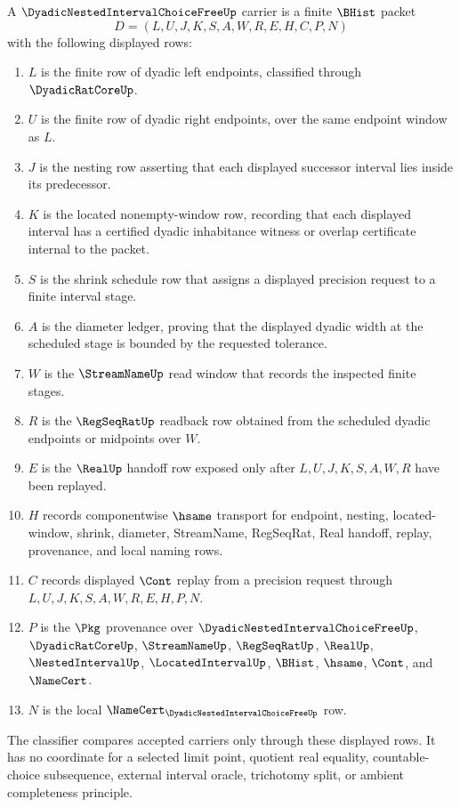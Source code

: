 \begin{definition}\label{def:dyadic-nested-interval-choice-free-carrier}
A $\DyadicNestedIntervalChoiceFreeUp$ carrier is a finite $\BHist$ packet
$$
D=(L,U,J,K,S,A,W,R,E,H,C,P,N)
$$
with the following displayed rows:
\begin{enumerate}
\item $L$ is the finite row of dyadic left endpoints, classified through $\DyadicRatCoreUp$.
\item $U$ is the finite row of dyadic right endpoints, over the same endpoint window as $L$.
\item $J$ is the nesting row asserting that each displayed successor interval lies inside its predecessor.
\item $K$ is the located nonempty-window row, recording that each displayed interval has a certified dyadic inhabitance witness or overlap certificate internal to the packet.
\item $S$ is the shrink schedule row that assigns a displayed precision request to a finite interval stage.
\item $A$ is the diameter ledger, proving that the displayed dyadic width at the scheduled stage is bounded by the requested tolerance.
\item $W$ is the $\StreamNameUp$ read window that records the inspected finite stages.
\item $R$ is the $\RegSeqRatUp$ readback row obtained from the scheduled dyadic endpoints or midpoints over $W$.
\item $E$ is the $\RealUp$ handoff row exposed only after $L,U,J,K,S,A,W,R$ have been replayed.
\item $H$ records componentwise $\hsame$ transport for endpoint, nesting, located-window, shrink, diameter, StreamName, RegSeqRat, Real handoff, replay, provenance, and local naming rows.
\item $C$ records displayed $\Cont$ replay from a precision request through $L,U,J,K,S,A,W,R,E,H,P,N$.
\item $P$ is the $\Pkg$ provenance over $\DyadicNestedIntervalChoiceFreeUp$, $\DyadicRatCoreUp$, $\StreamNameUp$, $\RegSeqRatUp$, $\RealUp$, $\NestedIntervalUp$, $\LocatedIntervalUp$, $\BHist$, $\hsame$, $\Cont$, and $\NameCert$.
\item $N$ is the local $\NameCert_{\DyadicNestedIntervalChoiceFreeUp}$ row.
\end{enumerate}
The classifier compares accepted carriers only through these displayed rows. It has no coordinate for a selected limit point, quotient real equality, countable-choice subsequence, external interval oracle, trichotomy split, or ambient completeness principle.
\end{definition}

